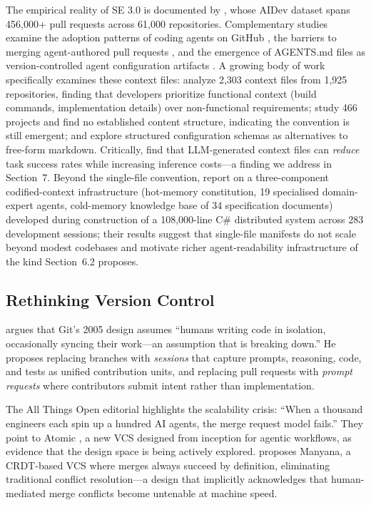 \documentclass[12pt]{article}
\begin{document}
The empirical reality of SE 3.0 is documented by \citet{li2025rise}, whose AIDev dataset spans 456,000+ pull requests across 61,000 repositories. Complementary studies examine the adoption patterns of coding agents on GitHub \citep{agentic2026adoption}, the barriers to merging agent-authored pull requests \citep{agentpr2026unmerged}, and the emergence of AGENTS.md files as version-controlled agent configuration artifacts \citep{agentsmd2026impact}. A growing body of work specifically examines these context files: \citet{chatlatanagulchai2025agentreadmes} analyze 2,303 context files from 1,925 repositories, finding that developers prioritize functional context (build commands, implementation details) over non-functional requirements; \citet{mohsenimofidi2025contextengineering} study 466 projects and find no established content structure, indicating the convention is still emergent; and \citet{galster2026configuring} explore structured configuration schemas as alternatives to free-form markdown. Critically, \citet{gloaguen2026evaluatingagentsmd} find that LLM-generated context files can \textit{reduce} task success rates while increasing inference costs---a finding we address in Section~7. Beyond the single-file convention, \citet{codifiedcontext2026} report on a three-component codified-context infrastructure (hot-memory constitution, 19 specialised domain-expert agents, cold-memory knowledge base of 34 specification documents) developed during construction of a 108{,}000-line C\# distributed system across 283 development sessions; their results suggest that single-file manifests do not scale beyond modest codebases and motivate richer agent-readability infrastructure of the kind Section~6.2 proposes.

\subsection{Rethinking Version Control}

\citet{pinera2026rethinking} argues that Git's 2005 design assumes ``humans writing code in isolation, occasionally syncing their work---an assumption that is breaking down.'' He proposes replacing branches with \textit{sessions} that capture prompts, reasoning, code, and tests as unified contribution units, and replacing pull requests with \textit{prompt requests} where contributors submit intent rather than implementation.

The All Things Open editorial \citep{ato2026versioncontrol} highlights the scalability crisis: ``When a thousand engineers each spin up a hundred AI agents, the merge request model fails.'' They point to Atomic \citep{atomic2026}, a new VCS designed from inception for agentic workflows, as evidence that the design space is being actively explored. \citet{cohen2026manyana} proposes Manyana, a CRDT-based VCS where merges always succeed by definition, eliminating traditional conflict resolution---a design that implicitly acknowledges that human-mediated merge conflicts become untenable at machine speed.
\end{document}
